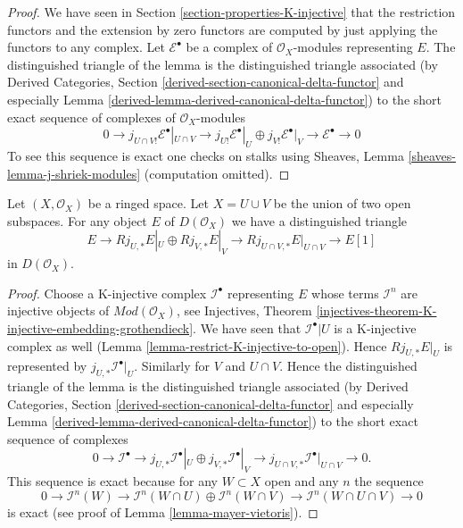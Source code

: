 \begin{proof}
We have seen in Section \ref{section-properties-K-injective}
that the restriction functors and the extension
by zero functors are computed by just applying the functors to
any complex. Let $\mathcal{E}^\bullet$ be a complex of $\mathcal{O}_X$-modules
representing $E$. The distinguished triangle of the lemma is the
distinguished triangle associated (by
Derived Categories, Section
\ref{derived-section-canonical-delta-functor} and especially
Lemma \ref{derived-lemma-derived-canonical-delta-functor})
to the short exact sequence of complexes of $\mathcal{O}_X$-modules
$$
0 \to j_{U \cap V!}\mathcal{E}^\bullet|_{U \cap V} \to
j_{U!}\mathcal{E}^\bullet|_U \oplus j_{V!}\mathcal{E}^\bullet|_V
\to \mathcal{E}^\bullet \to 0
$$
To see this sequence is exact one checks on stalks using
Sheaves, Lemma \ref{sheaves-lemma-j-shriek-modules}
(computation omitted).
\end{proof}

\begin{lemma}
\label{lemma-exact-sequence-j-star}
Let $(X, \mathcal{O}_X)$ be a ringed space.
Let $X = U \cup V$ be the union of two open subspaces.
For any object $E$ of $D(\mathcal{O}_X)$ we have a distinguished
triangle
$$
E \to
Rj_{U, *}E|_U \oplus Rj_{V, *}E|_V \to
Rj_{U \cap V, *}E|_{U \cap V} \to
E[1]
$$
in $D(\mathcal{O}_X)$.
\end{lemma}

\begin{proof}
Choose a K-injective complex $\mathcal{I}^\bullet$ representing $E$
whose terms $\mathcal{I}^n$ are injective objects of
$\textit{Mod}(\mathcal{O}_X)$, see Injectives, Theorem
\ref{injectives-theorem-K-injective-embedding-grothendieck}.
We have seen that $\mathcal{I}^\bullet|U$ is a K-injective complex
as well (Lemma \ref{lemma-restrict-K-injective-to-open}). Hence
$Rj_{U, *}E|_U$ is represented by $j_{U, *}\mathcal{I}^\bullet|_U$.
Similarly for $V$ and $U \cap V$. Hence the distinguished triangle
of the lemma is the distinguished triangle associated (by
Derived Categories, Section
\ref{derived-section-canonical-delta-functor} and especially
Lemma \ref{derived-lemma-derived-canonical-delta-functor})
to the short exact sequence of complexes
$$
0 \to
\mathcal{I}^\bullet \to
j_{U, *}\mathcal{I}^\bullet|_U \oplus j_{V, *}\mathcal{I}^\bullet|_V \to
j_{U \cap V, *}\mathcal{I}^\bullet|_{U \cap V} \to
0.
$$
This sequence is exact because for any $W \subset X$ open
and any $n$ the sequence
$$
0 \to
\mathcal{I}^n(W) \to
\mathcal{I}^n(W \cap U) \oplus \mathcal{I}^n(W \cap V) \to
\mathcal{I}^n(W \cap U \cap V) \to
0
$$
is exact (see proof of Lemma \ref{lemma-mayer-vietoris}).
\end{proof}

